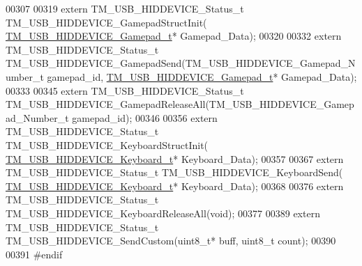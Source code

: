 \begin{DoxyCode}
00307 
00319 \textcolor{keyword}{extern} TM\_USB\_HIDDEVICE\_Status\_t TM\_USB\_HIDDEVICE\_GamepadStructInit(
      \hyperlink{struct_t_m___u_s_b___h_i_d_d_e_v_i_c_e___gamepad__t}{TM\_USB\_HIDDEVICE\_Gamepad\_t}* Gamepad\_Data);
00320 
00332 \textcolor{keyword}{extern} TM\_USB\_HIDDEVICE\_Status\_t TM\_USB\_HIDDEVICE\_GamepadSend(TM\_USB\_HIDDEVICE\_Gamepad\_Number\_t gamepad\_id,
       \hyperlink{struct_t_m___u_s_b___h_i_d_d_e_v_i_c_e___gamepad__t}{TM\_USB\_HIDDEVICE\_Gamepad\_t}* Gamepad\_Data);
00333 
00345 \textcolor{keyword}{extern} TM\_USB\_HIDDEVICE\_Status\_t TM\_USB\_HIDDEVICE\_GamepadReleaseAll(TM\_USB\_HIDDEVICE\_Gamepad\_Number\_t 
      gamepad\_id);
00346 
00356 \textcolor{keyword}{extern} TM\_USB\_HIDDEVICE\_Status\_t TM\_USB\_HIDDEVICE\_KeyboardStructInit(
      \hyperlink{struct_t_m___u_s_b___h_i_d_d_e_v_i_c_e___keyboard__t}{TM\_USB\_HIDDEVICE\_Keyboard\_t}* Keyboard\_Data);
00357 
00367 \textcolor{keyword}{extern} TM\_USB\_HIDDEVICE\_Status\_t TM\_USB\_HIDDEVICE\_KeyboardSend(
      \hyperlink{struct_t_m___u_s_b___h_i_d_d_e_v_i_c_e___keyboard__t}{TM\_USB\_HIDDEVICE\_Keyboard\_t}* Keyboard\_Data);
00368 
00376 \textcolor{keyword}{extern} TM\_USB\_HIDDEVICE\_Status\_t TM\_USB\_HIDDEVICE\_KeyboardReleaseAll(\textcolor{keywordtype}{void});
00377 
00389 \textcolor{keyword}{extern} TM\_USB\_HIDDEVICE\_Status\_t TM\_USB\_HIDDEVICE\_SendCustom(uint8\_t* buff, uint8\_t count);
00390 
00391 \textcolor{preprocessor}{#endif}
\end{DoxyCode}
